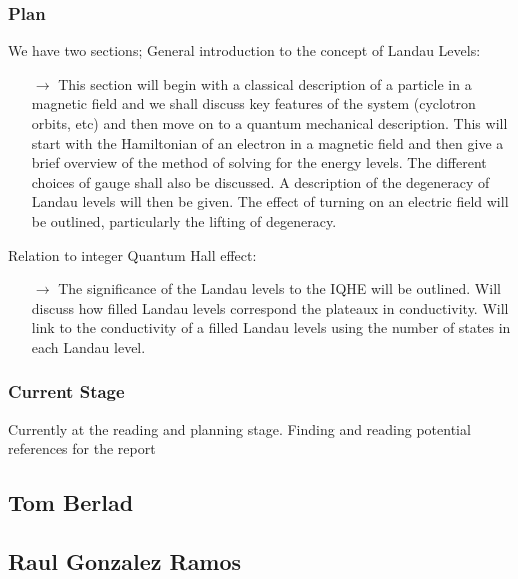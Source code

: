 \documentclass[12pt]{article}
\newcommand{\PRLsep}{\noindent\makebox[\linewidth]{\resizebox{0.3333\linewidth}{1pt}{$\bullet$}}\bigskip}
\begin{document}
\subsubsection*{Plan}
We have two sections;
General introduction to the concept of Landau Levels:
\begin{enumerate}
    \item[$\to$] This section will begin with a classical description of a particle in a magnetic field and we shall discuss key features of the system (cyclotron orbits, etc) and then
        move on to a quantum mechanical description. This will start with the Hamiltonian of an electron in a magnetic field and then give a brief overview of the method of solving for the energy levels.
        The different choices of gauge shall also be discussed. A description of the degeneracy of Landau levels will then be given. The effect of turning on an electric field will be outlined, particularly the lifting of degeneracy.
\end{enumerate}
Relation to integer Quantum Hall effect:
\begin{enumerate}
    \item[$\to$] The significance of the Landau levels to the IQHE will be outlined. Will discuss how filled Landau levels correspond the
        plateaux in conductivity. Will link to the conductivity of a filled Landau levels using the number of states in each Landau level.
\end{enumerate}
\subsubsection*{Current Stage}
Currently at the reading and planning stage. Finding and reading potential references for the report

\vspace{0.5cm}
\PRLsep
\newpage

\subsection*{Tom Berlad}

\subsection*{Raul Gonzalez Ramos}
\end{document}

